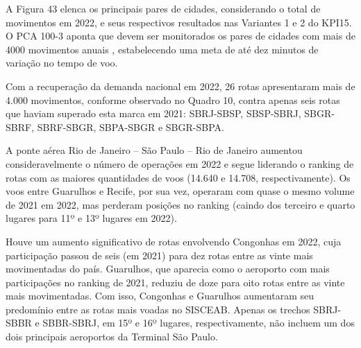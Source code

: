 \documentclass[
]{book}
\begin{document}
A Figura 43 elenca os principais pares de cidades, considerando o total de movimentos em 2022, e seus respectivos resultados nas Variantes 1 e 2 do KPI15. O PCA 100-3 aponta que devem ser monitorados os pares de cidades com mais de 4000 movimentos anuais , estabelecendo uma meta de até dez minutos de variação no tempo de voo.

Com a recuperação da demanda nacional em 2022, 26 rotas apresentaram mais de 4.000 movimentos, conforme observado no Quadro 10, contra apenas seis rotas que haviam superado esta marca em 2021: SBRJ-SBSP, SBSP-SBRJ, SBGR-SBRF, SBRF-SBGR, SBPA-SBGR e SBGR-SBPA.

A ponte aérea Rio de Janeiro -- São Paulo -- Rio de Janeiro aumentou consideravelmente o número de operações em 2022 e segue liderando o ranking de rotas com as maiores quantidades de voos (14.640 e 14.708, respectivamente). Os voos entre Guarulhos e Recife, por sua vez, operaram com quase o mesmo volume de 2021 em 2022, mas perderam posições no ranking (caindo dos terceiro e quarto lugares para 11º e 13º lugares em 2022).

Houve um aumento significativo de rotas envolvendo Congonhas em 2022, cuja participação passou de seis (em 2021) para dez rotas entre as vinte mais movimentadas do país. Guarulhos, que aparecia como o aeroporto com mais participações no ranking de 2021, reduziu de doze para oito rotas entre as vinte mais movimentadas. Com isso, Congonhas e Guarulhos aumentaram seu predomínio entre as rotas mais voadas no SISCEAB. Apenas os trechos SBRJ-SBBR e SBBR-SBRJ, em 15º e 16º lugares, respectivamente, não incluem um dos dois principais aeroportos da Terminal São Paulo.
\end{document}
